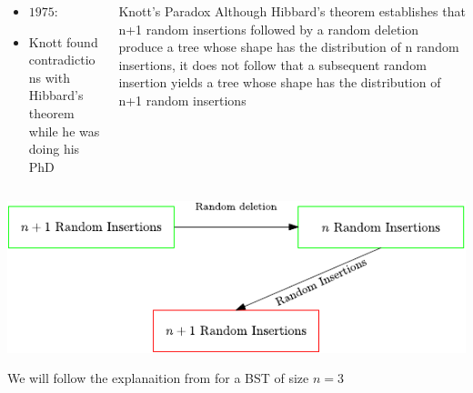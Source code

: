 \documentclass{beamer}
\begin{document}
\begin{frame}
    
\begin{columns}[c]
    \begin{column}{0.5\textwidth}
     \begin{itemize}
         \item $1975$: \cite{knott1975deletion}
             \pause
         \item Knott found contradictions with Hibbard's theorem while he was doing his PhD
     \end{itemize}
    \end{column}
    \begin{column}{0.5\textwidth}
        \begin{center}
             \pause
            \begin{block}{Knott's Paradox}
                Although Hibbard’s theorem establishes that n+1 random insertions
                followed by a random deletion produce a tree whose shape has the distribution of n random insertions, it does not follow that a
                subsequent random insertion yields a tree whose shape has the distribution of n+1 random insertions
            \end{block}
        \end{center}
    \end{column}
    
\end{columns}
\end{frame}

\begin{frame}
    \begin{center}
        \includegraphics[]{bst.pdf}
    \end{center}
\end{frame}

\begin{frame}
    We will follow the explanaition from \cite{jonassen1978trivial} for a BST of size $n = 3$
\end{frame}
\end{document}
